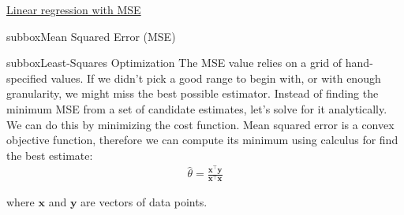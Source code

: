 \begin{textbox}{\href{https://compneuro.neuromatch.io/tutorials/W1D2_ModelFitting/chapter_title.html}{Linear regression with MSE }}
\begin{subbox}{subbox}{Mean Squared Error (MSE)}
\end{subbox}
\begin{subbox}{subbox}{Least-Squares Optimization}
\scriptsize
The MSE value relies on a grid of hand-specified values. If we didn't pick a good range to begin with, or with enough granularity, we might miss the best possible estimator. Instead of finding the minimum MSE from a set of candidate estimates, let's solve for it analytically.
We can do this by minimizing the cost function. Mean squared error is a convex objective function, therefore we can compute its minimum using calculus for find the best estimate: \begin{align}
\hat\theta = \frac{\mathbf{x}^\top \mathbf{y}}{\mathbf{x}^\top \mathbf{x}}
\end{align}

where $\mathbf{x}$ and $\mathbf{y}$ are vectors of data points.

\end{subbox}

\end{textbox}
